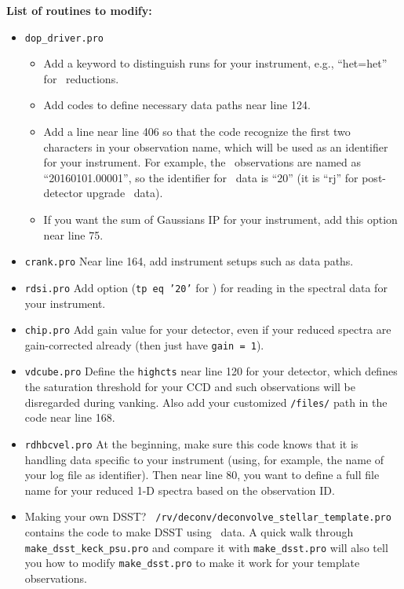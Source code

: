 {\bf List of routines to modify:}
\begin{itemize}
\item {\tt dop\_driver.pro}
  \begin{itemize}
    \item Add a keyword to distinguish runs for your instrument, e.g.,
      ``het=het'' for \het\ reductions.
    \item Add codes to define necessary data paths near line 124.
    \item Add a line near line 406 so that the code recognize the
      first two characters in your observation name, which will be used as
      an identifier for your instrument. For example, the \het\ observations
      are named as ``20160101.00001'', so the identifier for \het\ data is
      ``20'' (it is ``rj'' for post-detector upgrade \keck\ data).
    \item If you want the sum of Gaussians IP for your instrument,
      add this option near line 75.
  \end{itemize}
\item {\tt crank.pro} Near line 164, add instrument setups such as
  data paths.
\item {\tt rdsi.pro} Add option ({\tt tp eq '20'} for \het) for
  reading in the spectral data for your instrument.
\item {\tt chip.pro} Add gain value for your detector, even if your
  reduced spectra are gain-corrected already (then just have {\tt gain =
    1}).
\item {\tt vdcube.pro} Define the {\tt highcts} near line 120 for your
  detector, which defines the saturation threshold for your CCD and such
  observations will be disregarded during vanking. Also add your
  customized {\tt /files/} path in the code near line 168.
\item {\tt rdhbcvel.pro} At the beginning, make sure this code knows
  that it is handling data specific to your instrument (using, for
  example, the name of your log file as identifier). Then near line 80,
  you want to define a full file name for your reduced 1-D spectra based
  on the observation ID.
\item Making your own DSST? {\tt
    /rv/deconv/deconvolve\_stellar\_template.pro} contains the code to
  make DSST using \het\ data. A quick walk through {\tt
    make\_dsst\_keck\_psu.pro} and compare it with {\tt make\_dsst.pro}
  will also tell you how to modify {\tt make\_dsst.pro} to make it work
  for your template observations.
\end{itemize}

